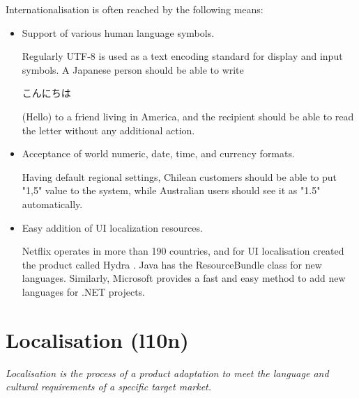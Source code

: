 Internationalisation is often reached by the following means:
\begin{itemize}
\item Support of various human language symbols.
  
Regularly UTF-8 is used as a text encoding standard for display and input symbols. A Japanese person should be able to write \begin{CJK}{UTF8}{min}こんにちは\end{CJK} (Hello) to a friend living in America, and the recipient should be able to read the letter without any additional action.

\item Acceptance of world numeric, date, time, and currency formats.
  
Having default regional settings, Chilean customers should be able to put "1,5" value to the system, while Australian users should see it as "1.5" automatically.

\item Easy addition of UI localization resources.
  
Netflix operates in more than 190 countries, and for UI localisation created the product called Hydra \cite{hydranetflix}. Java has the ResourceBundle class for new languages. Similarly, Microsoft provides a fast and easy method to add new languages for .NET projects.
\end{itemize}




\section{Localisation (l10n)}

\textit{Localisation is the process of a product adaptation to meet the language and cultural requirements of a specific target market.}

